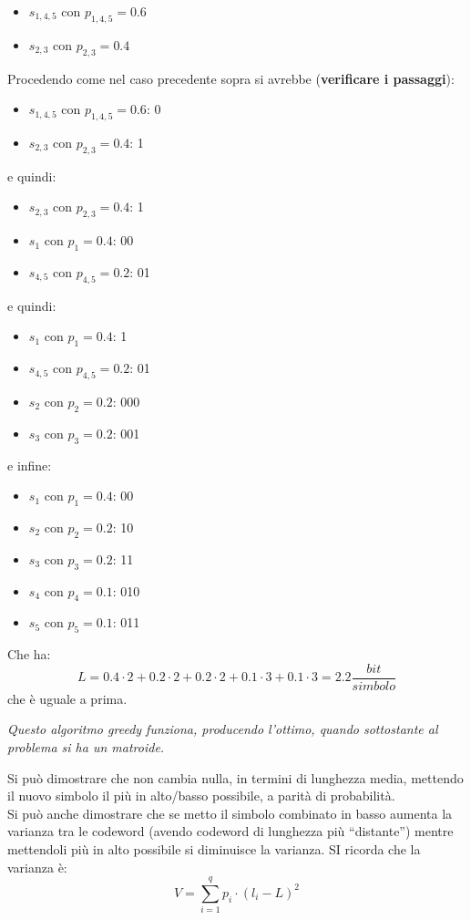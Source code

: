 \documentclass[a4paper,12pt, oneside]{book}
\begin{document}
\begin{esempio}
  \begin{itemize}
    \item $s_{1,4,5}$ con $p_{1,4,5}=0.6$
    \item $s_{2,3}$ con $p_{2,3}=0.4$
  \end{itemize}
  Procedendo come nel caso precedente sopra si avrebbe (\textbf{verificare i
    passaggi}): 
   \begin{itemize}
    \item $s_{1,4,5}$ con $p_{1,4,5}=0.6$: 0
    \item $s_{2,3}$ con $p_{2,3}=0.4$: 1
  \end{itemize}
  e quindi:
  \begin{itemize}
    \item $s_{2,3}$ con $p_{2,3}=0.4$: 1
    \item $s_1$ con $p_1=0.4$: 00
    \item $s_{4,5}$ con $p_{4,5}=0.2$: 01
  \end{itemize}
  e quindi:
  \begin{itemize}
    \item $s_1$ con $p_1=0.4$: 1
    \item $s_{4,5}$ con $p_{4,5}=0.2$: 01
    \item $s_2$ con $p_2=0.2$: 000
    \item $s_3$ con $p_3=0.2$: 001
  \end{itemize}
  e infine:
  \begin{itemize}
    \item $s_1$ con $p_1=0.4$: 00
    \item $s_2$ con $p_2=0.2$: 10
    \item $s_3$ con $p_3=0.2$: 11
    \item $s_4$ con $p_4=0.1$: 010
    \item $s_5$ con $p_5=0.1$: 011
  \end{itemize}
  Che ha:
  \[L=0.4\cdot 2+0.2\cdot 2+0.2\cdot 2+0.1\cdot 3+0.1\cdot 3 =
    2.2\frac{bit}{simbolo}\]
  che è uguale a prima.
\end{esempio}
\textit{Questo algoritmo greedy funziona, producendo l'ottimo, quando
  sottostante al problema si ha un matroide.}
\begin{teorema}
  Si può dimostrare che non cambia nulla, in termini di lunghezza media,
  mettendo il nuovo simbolo il più in alto/basso possibile, a parità di
  probabilità.\\
  Si può anche
  dimostrare che se metto il simbolo combinato in basso aumenta la varianza tra
  le codeword (avendo codeword di lunghezza più ``distante'') mentre mettendoli
  più in alto possibile si diminuisce la varianza. SI ricorda che la varianza è:
  \[V=\sum_{i=1}^q p_i\cdot (l_i-L)^2\]
\end{teorema}
\end{document}
